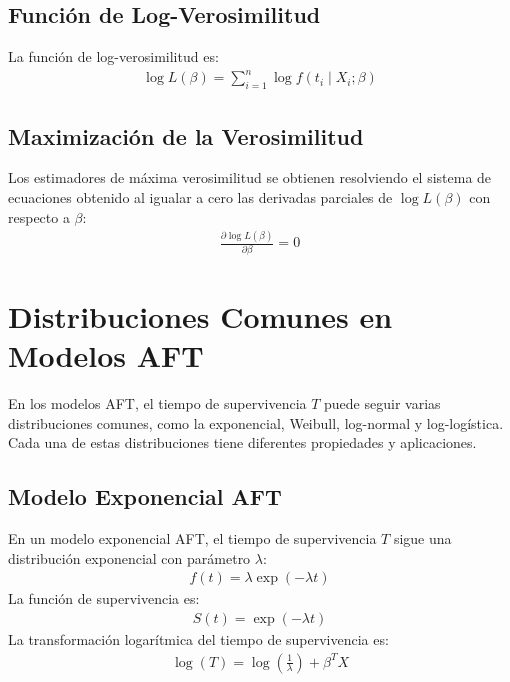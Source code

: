 \documentclass[a4paper]{report} %
\begin{document}
\subsection{Funci\'on de Log-Verosimilitud}
La funci\'on de log-verosimilitud es:
\begin{eqnarray*}
\log L(\beta) = \sum_{i=1}^n \log f(t_i \mid X_i; \beta)
\end{eqnarray*}

\subsection{Maximizaci\'on de la Verosimilitud}
Los estimadores de m\'axima verosimilitud se obtienen resolviendo el sistema de ecuaciones obtenido al igualar a cero las derivadas parciales de $\log L(\beta)$ con respecto a $\beta$:
\begin{eqnarray*}
\frac{\partial \log L(\beta)}{\partial \beta} = 0
\end{eqnarray*}

\section{Distribuciones Comunes en Modelos AFT}
En los modelos AFT, el tiempo de supervivencia $T$ puede seguir varias distribuciones comunes, como la exponencial, Weibull, log-normal y log-log\'istica. Cada una de estas distribuciones tiene diferentes propiedades y aplicaciones.

\subsection{Modelo Exponencial AFT}
En un modelo exponencial AFT, el tiempo de supervivencia $T$ sigue una distribuci\'on exponencial con par\'ametro $\lambda$:
\begin{eqnarray*}
f(t) = \lambda \exp(-\lambda t)
\end{eqnarray*}
La funci\'on de supervivencia es:
\begin{eqnarray*}
S(t) = \exp(-\lambda t)
\end{eqnarray*}
La transformaci\'on logar\'itmica del tiempo de supervivencia es:
\begin{eqnarray*}
\log(T) = \log\left(\frac{1}{\lambda}\right) + \beta^T X
\end{eqnarray*}
\end{document}
